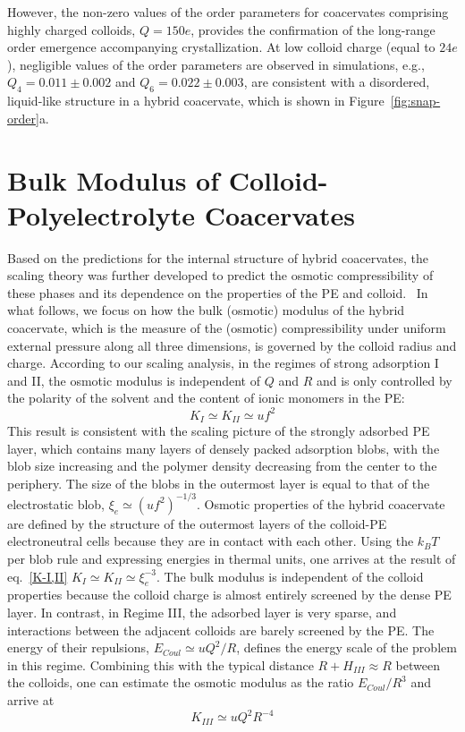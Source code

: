 \documentclass[journal=mamobx, manuscript=article]{achemso}
\begin{document}
However, the non-zero values of the order parameters for coacervates comprising highly charged colloids, $Q = 150e$, provides the confirmation of the long-range order emergence accompanying crystallization. At low colloid charge (equal to $24e$), negligible values of the order parameters are observed in simulations, e.g., $Q_4 = 0.011 \pm 0.002$ and $Q_6 = 0.022 \pm 0.003$, are consistent with a disordered, liquid-like structure in a hybrid coacervate, which is shown in Figure~\ref{fig:snap-order}a.   




\section{Bulk Modulus of Colloid-Polyelectrolyte Coacervates}
\label{section:modulus}

Based on the predictions for the internal structure of hybrid coacervates, the scaling theory was further developed to predict the osmotic compressibility of these phases and its dependence on the properties of the PE and colloid.~\cite{artem2022hybrid} In what follows, we focus on how the bulk (osmotic) modulus of the hybrid coacervate, which is the measure of the (osmotic) compressibility under uniform external pressure along all three dimensions, is governed by the colloid radius and charge. According to our scaling analysis, in the regimes of strong adsorption I and II, the osmotic modulus is independent of $Q$ and $R$ and is only controlled by the polarity of the solvent and the content of ionic monomers in the PE: 
\begin{equation}
K_{I} \simeq K_{II} \simeq uf^{2}
\label{K-I,II}
\end{equation}
This result is consistent with the scaling picture of the strongly adsorbed PE layer, which contains many layers of densely packed adsorption blobs, with the blob size increasing and the polymer density decreasing from the center to the periphery. The size of the blobs in the outermost layer is equal to that of the electrostatic blob, $\xi_{e} \simeq \left( u f^2 \right)^{-1/3}$. Osmotic properties of the hybrid coacervate are defined by the structure of the outermost layers of the colloid-PE electroneutral cells because they are in contact with each other. Using the $k_B T$ per blob rule and expressing energies in thermal units, one arrives at the result of eq.~\ref{K-I,II} $K_{I} \simeq K_{II} \simeq \xi_{e}^{-3}$. The bulk modulus is independent of the colloid properties because the colloid charge is almost entirely screened by the dense PE layer. In contrast, in Regime III, the adsorbed layer is very sparse, and interactions between the adjacent colloids are barely screened by the PE. The energy of their repulsions, $E_{Coul} \simeq u Q^2 / R$, defines the energy scale of the problem in this regime. Combining this with the typical distance $R+H_{III} \approx R$ between the colloids, one can estimate the osmotic modulus as the ratio $E_{Coul} / R^3$ and arrive at~\cite{artem2022hybrid}  
\begin{equation}
K_{III} \simeq uQ^{2}R^{-4}
\label{K-III}
\end{equation}
\end{document}
